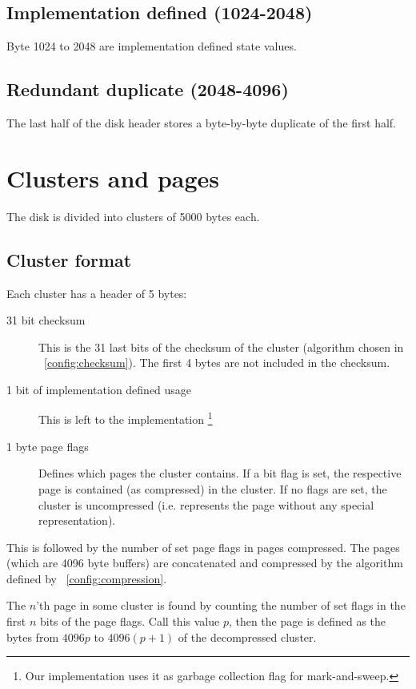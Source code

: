 \documentclass[11pt,a4paper]{report}
\begin{document}
        \subsection{Implementation defined (1024-2048)}
        Byte 1024 to 2048 are implementation defined state values.

        \subsection{Redundant duplicate (2048-4096)}
        The last half of the disk header stores a byte-by-byte duplicate of the
        first half.

    \section{Clusters and pages}
        The disk is divided into clusters of 5000 bytes each.

        \subsection{Cluster format}
        Each cluster has a header of 5 bytes:

        \begin{description}
            \item [31 bit checksum] This is the 31 last bits of the checksum of
                the cluster (algorithm chosen in ~\ref{config:checksum}). The
                first 4 bytes are not included in the checksum.
            \item [1 bit of implementation defined usage] This is left to the
                implementation \footnote{Our implementation uses it as garbage
                collection flag for mark-and-sweep.}
            \item [1 byte page flags] Defines which pages the cluster contains.
                If a bit flag is set, the respective page is contained (as
                compressed) in the cluster. If no flags are set, the cluster is
                uncompressed (i.e. represents the page without any special
                representation).
        \end{description}

        This is followed by the number of set page flags in pages compressed.
        The pages (which are 4096 byte buffers) are concatenated and compressed
        by the algorithm defined by ~\ref{config:compression}.

        The $n$'th page in some cluster is found by counting the number of set
        flags in the first $n$ bits of the page flags. Call this value $p$,
        then the page is defined as the bytes from $4096p$ to $4096(p + 1)$ of
        the decompressed cluster.
\end{document}
